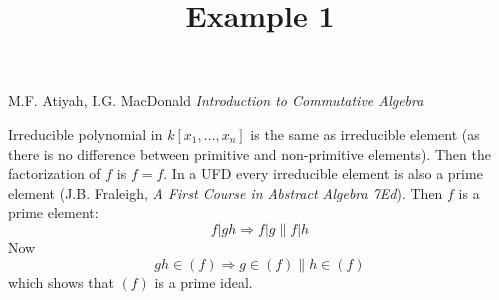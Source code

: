\documentclass{article}
\title{Example 1}
\begin{document}
\maketitle

\begin{center}
M.F. Atiyah, I.G. MacDonald \emph{Introduction to Commutative Algebra}
\end{center}

\vspace*{10px} 

Irreducible polynomial in $ k[x_1, \dots, x_n] $ is the same as irreducible element (as there is no difference between primitive and non-primitive elements). Then the factorization of $f$ is $f = f$. In a UFD every irreducible element is also a prime element (J.B. Fraleigh, \emph{A First Course in Abstract Algebra 7Ed}). Then $f$ is a prime element:
\[
f | gh \Rightarrow f | g \parallel f | h
\]
Now
\[
gh \in (f) \Rightarrow g \in (f) \parallel h \in (f)
\]
which shows that $(f)$ is a prime ideal.
\end{document}
